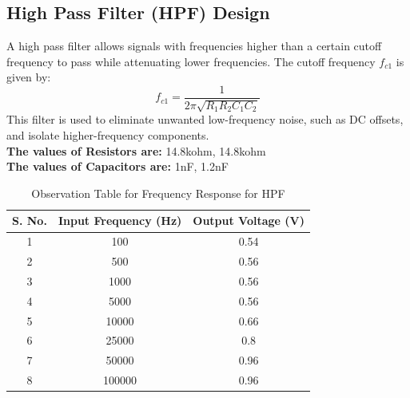 \documentclass[a4paper,12pt]{article}
\begin{document}
\subsection{High Pass Filter (HPF) Design}
A high pass filter allows signals with frequencies higher than a certain cutoff frequency to pass while attenuating lower frequencies. The cutoff frequency $f_{c1}$ is given by:
\begin{equation}
    f_{c1} = \frac{1}{2\pi \sqrt{R_1 R_2 C_1 C_2}}
\end{equation}
This filter is used to eliminate unwanted low-frequency noise, such as DC offsets, and isolate higher-frequency components.\\
\textbf{The values of Resistors are:} 14.8kohm, 14.8kohm \\
\textbf{The values of Capacitors are:} 1nF, 1.2nF \\
\begin{figure}[H]
    \centering
    \hfill
\end{figure}
\begin{table}[H]
    \centering
    \renewcommand{\arraystretch}{1.3} %
    \begin{tabular}{|c|c|c|}
        \hline
        \textbf{S. No.} & \textbf{Input Frequency (Hz)} &\textbf{Output Voltage (V)} \\
        \hline
        1 & 100 & 0.54  \\
        2 & 500 & 0.56  \\
        3 & 1000 & 0.56  \\
        4 & 5000 & 0.56  \\
        5 & 10000 & 0.66  \\
        6 & 25000 & 0.8  \\
        7 & 50000 & 0.96  \\
        8 & 100000 & 0.96  \\
        \hline
    \end{tabular}
    \caption{Observation Table for Frequency Response for HPF}
    \label{tab:observation}
\end{table}
\end{document}
